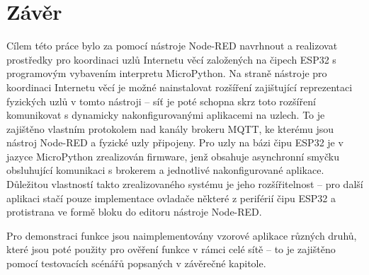 \chapter{Závěr}
\label{ch:zaver}

Cílem této práce bylo za pomocí nástroje Node-RED navrhnout a realizovat prostředky pro koordinaci uzlů Internetu věcí
založených na čipech ESP32 s programovým vybavením interpretu MicroPython.
Na straně nástroje pro koordinaci Internetu věcí je možné nainstalovat rozšíření zajištující reprezentaci fyzických
uzlů v tomto nástroji
-- síť je poté schopna skrz toto rozšíření komunikovat s dynamicky nakonfigurovanými aplikacemi na uzlech.
To je zajištěno vlastním protokolem nad kanály brokeru MQTT, ke kterému jsou nástroj Node-RED a fyzické uzly připojeny.
Pro uzly na bázi čipu ESP32 je v jazyce MicroPython zrealizován firmware, jenž obsahuje asynchronní smyčku
obsluhující komunikaci s brokerem a jednotlivé nakonfigurované aplikace.
Důležitou vlastností takto zrealizovaného systému je jeho rozšířitelnost -- pro další aplikaci stačí pouze implementace
ovladače některé z periférií čipu ESP32 a protistrana ve formě bloku do editoru nástroje Node-RED.

Pro demonstraci funkce jsou naimplementovány vzorové aplikace různých druhů, které jsou poté použity pro ověření
funkce v rámci celé sítě -- to je zajištěno pomocí testovacích scénářů popsaných v závěrečné kapitole.